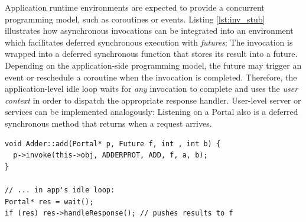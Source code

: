 Application runtime environments are expected to provide a concurrent programming model, such as coroutines or events. Listing \ref{lst:inv_stub} illustrates how asynchronous invocations can be integrated into an environment which facilitates deferred synchronous execution with \emph{futures}: The invocation is wrapped into a deferred synchronous function that stores its result into a future. Depending on the application-side programming model, the future may trigger an event or reschedule a coroutine when the invocation is completed. Therefore, the application-level idle loop waits for \emph{any} invocation to complete and uses the \emph{user context}  in order to dispatch the appropriate response handler. User-level server or services can be implemented analogously: Listening on a Portal also is a deferred synchronous method that returns when a request arrives.

\begin{lstlisting}[float, label=lst:inv_stub, caption=Example for issuing invocation user-side.]
void Adder::add(Portal* p, Future f, int , int b) {
  p->invoke(this->obj, ADDERPROT, ADD, f, a, b); 
}

// ... in app's idle loop:
Portal* res = wait();
if (res) res->handleResponse(); // pushes results to f
\end{lstlisting}

\FloatBarrier




